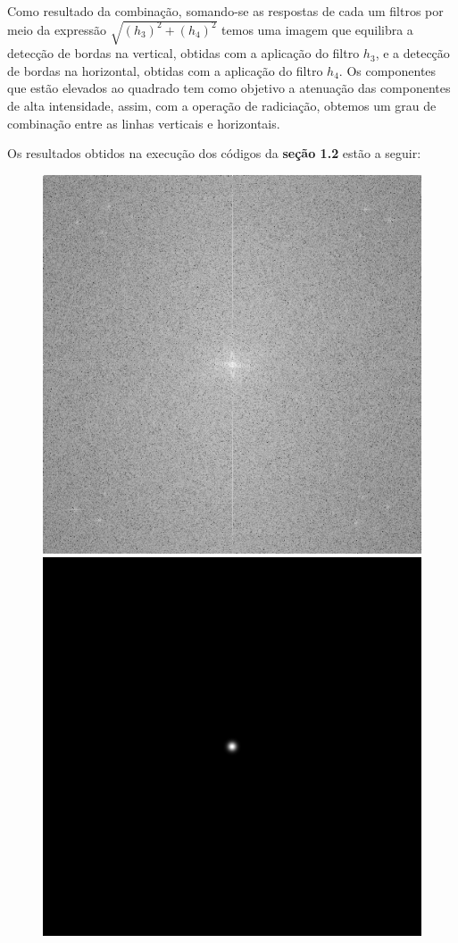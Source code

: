 \documentclass[twoside,twocolumn]{article}
\begin{document}
Como resultado da combinação, somando-se as respostas de cada um filtros por meio da expressão $\sqrt{(h_{3})^{2} + (h_{4})^{2}}$ temos uma imagem que equilibra a detecção de bordas na vertical, obtidas com a aplicação do filtro $h_{3}$, e a detecção de bordas na horizontal, obtidas com a aplicação do filtro $h_{4}$. Os componentes que estão elevados ao quadrado tem como objetivo a atenuação das componentes de alta intensidade, assim, com a operação de radiciação, obtemos um grau de combinação entre as linhas verticais e horizontais.

Os resultados obtidos na execução dos códigos da \textbf{seção 1.2} estão a seguir:

\begin{figure}[H]
\begin{center}
	\includegraphics[scale=.17]{figures/baboon_mag_spec_4.png}
	\includegraphics[scale=.17]{figures/baboon_gau_filter_4.png}

\end{center}
\end{figure}
\end{document}
